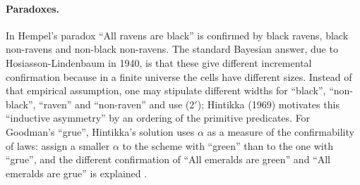 \paragraph{Paradoxes.} In Hempel's paradox ``All ravens are black'' is
confirmed by black ravens, black non-ravens and non-black non-ravens. The
standard Bayesian answer, due to Hosiasson-Lindenbaum in 1940, is that
these give different incremental confirmation because in a finite universe
the cells have different sizes. Instead of that empirical assumption, one
may stipulate different widths for ``black'', ``non-black'', ``raven'' and
``non-raven'' and use (2\('\)); Hintikka (1969) motivates this ``inductive
asymmetry'' by an ordering of the primitive predicates. For Goodman's
``grue'', Hintikka's solution uses \(\alpha\) as a measure of the
confirmability of laws: assign a smaller \(\alpha\) to the scheme with
``green'' than to the one with ``grue'', and the different confirmation of
``All emeralds are green'' and ``All emeralds are grue'' is explained
\cite[p.~333]{Niiniluoto2011HintikkaProgramReading}.

